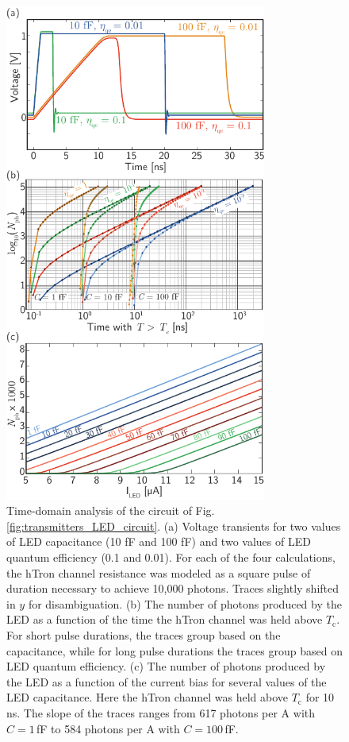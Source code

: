 \documentclass[aip,amsmath,amssymb,reprint,nofootinbib]{revtex4-1}
\begin{document}
\begin{figure}%
	\centerline{\includegraphics[width=8.6cm]{_transmitters_LED_data_small.pdf}}
	\caption{\label{fig:transmitters_LED_data}Time-domain analysis of the circuit of Fig. \ref{fig:transmitters_LED_circuit}. (a) Voltage transients for two values of LED capacitance (10 fF and 100 fF) and two values of LED quantum efficiency (0.1 and 0.01). For each of the four calculations, the hTron channel resistance was modeled as a square pulse of duration necessary to achieve 10,000 photons. Traces slightly shifted in $y$ for disambiguation. (b) The number of photons produced by the LED as a function of the time the hTron channel was held above $T_{\mathrm{c}}$. For short pulse durations, the traces group based on the capacitance, while for long pulse durations the traces group based on LED quantum efficiency. (c) The number of photons produced by the LED as a function of the current bias for several values of the LED capacitance. Here the hTron channel was held above $T_{\mathrm{c}}$ for 10\,ns. The slope of the traces ranges from 617 photons per \textmu A with $C = 1$\,fF to 584 photons per \textmu A with $C = 100$\,fF. }
\end{figure}
\end{document}
